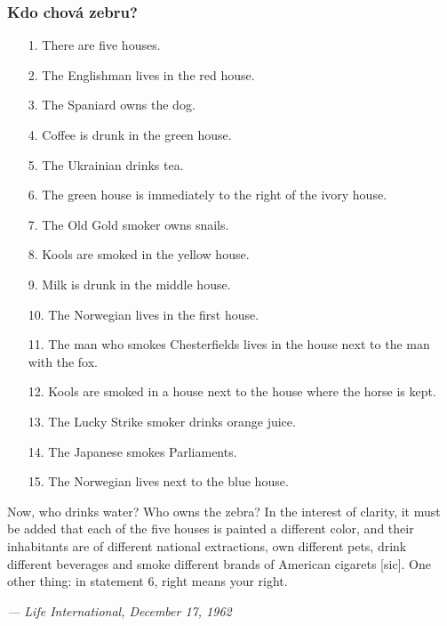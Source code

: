 \documentclass[red,professionalfont]{beamer}
\theoremstyle{definition}
\newcommand{\0}{\mbox{${\bf 0}$}}
\begin{document}
\begin{frame}\frametitle{Kdo chová zebru?}

{\tiny
\begin{itemize}
\item[1.] There are five houses.
\item[2.] The Englishman lives in the red house.
\item[3.] The Spaniard owns the dog.
\item[4.] Coffee is drunk in the green house.
\item[5.] The Ukrainian drinks tea.
\item[6.] The green house is immediately to the right of the ivory house.
\item[7.] The Old Gold smoker owns snails.
\item[8.] Kools are smoked in the yellow house.
\item[9.] Milk is drunk in the middle house.
\item[10.] The Norwegian lives in the first house.
\item[11.] The man who smokes Chesterfields lives in the house next to the man with the fox.
\item[12.] Kools are smoked in a house next to the house where the horse is kept.
\item[13.] The Lucky Strike smoker drinks orange juice.
\item[14.] The Japanese smokes Parliaments.
\item[15.] The Norwegian lives next to the blue house. 
\end{itemize}\pause

Now, who drinks water? Who owns the zebra? In the interest of clarity, it must be added that each of the five houses is painted a different color, and their inhabitants are of different national extractions, own different pets, drink different beverages and smoke different brands of American cigarets [sic]. One other thing: in statement 6, right means your right.

{\it \hfill — Life International, December 17, 1962}

}

\end{frame}
\end{document}
